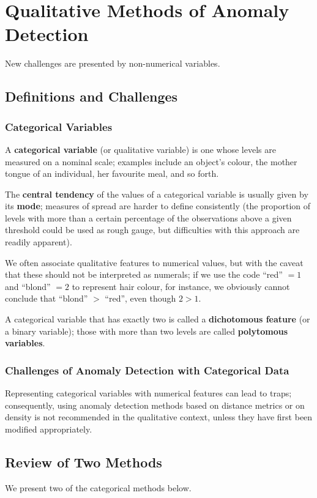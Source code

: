 \section{Qualitative Methods of Anomaly Detection}\label{Section:3}
New challenges are presented by non-numerical variables. 
\subsection{Definitions and Challenges}
\subsubsection*{Categorical Variables}
A \textbf{categorical variable} (or qualitative variable) is one whose levels are measured on a nominal scale; examples include an object's colour, the mother tongue of an individual, her favourite meal, and so forth.  

The \textbf{central tendency} of the values of a categorical variable is usually given by its \textbf{mode}; measures of spread are harder to define consistently (the proportion of levels with more than a certain percentage of the observations above a given threshold could be used as rough gauge, but difficulties with this approach are readily apparent). 

We often associate qualitative features to numerical values, but with the caveat that these should not be interpreted as numerals; if we use the code  ``red'' $=1$ and ``blond'' $=2$ to represent hair colour, for instance, we obviously cannot conclude that ``blond'' $>$ ``red'', even though $2>1$.   

A categorical variable that has exactly two  is called a \textbf{dichotomous feature} (or a binary variable); those with more than two levels are called  \textbf{polytomous variables}. %



\subsubsection*{Challenges of Anomaly Detection with  Categorical Data}
Representing categorical variables with numerical features can lead to traps; consequently, using anomaly detection methods based on distance metrics or on density is not recommended in the qualitative context, unless they have first been modified appropriately. 
\subsection{Review of Two Methods}
We present two of the categorical methods below. 
